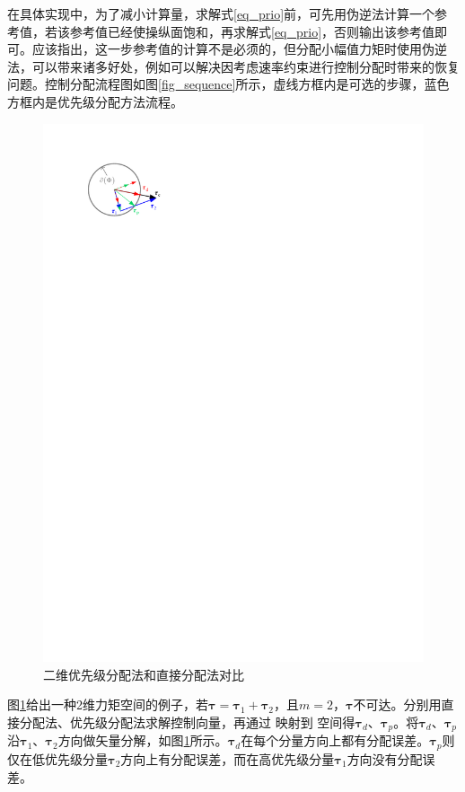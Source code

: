 在具体实现中，为了减小计算量，求解式\eqref{eq_prio}前，可先用伪逆法计算一个参考值，若该参考值已经使操纵面饱和，再求解式\eqref{eq_prio}，否则输出该参考值即可。应该指出，这一步参考值的计算不是必须的，但分配小幅值力矩时使用伪逆法，可以带来诸多好处，例如可以解决因考虑速率约束进行控制分配时带来的恢复问题\cite{Durham_2017}。控制分配流程图如图\ref{fig_sequence}所示，虚线方框内是可选的步骤，蓝色方框内是优先级分配方法流程。
\begin{figure}[htbp]
	\centering	
	\includegraphics[scale=1]{Fig/Fig6.pdf}
	\caption{\label{fig_case}二维优先级分配法和直接分配法对比}
\end{figure}

图\ref{fig_case}给出一种2维力矩空间的例子，若$\bm{\tau}=\bm{\tau}_1+\bm{\tau}_2$，且$m=2$，$\bm{\tau}$不可达。分别用直接分配法、优先级分配法求解控制向量，再通过 映射到 空间得$\bm{\tau}_d$、$\bm{\tau}_p$。将$\bm{\tau}_d$、$\bm{\tau}_p$沿$\bm{\tau}_1$、$\bm{\tau}_2$方向做矢量分解，如图\ref{fig_case}所示。$\bm{\tau}_d$在每个分量方向上都有分配误差。$\bm{\tau}_p$则仅在低优先级分量$\bm{\tau}_2$方向上有分配误差，而在高优先级分量$ \bm{\tau}_1 $方向没有分配误差。

